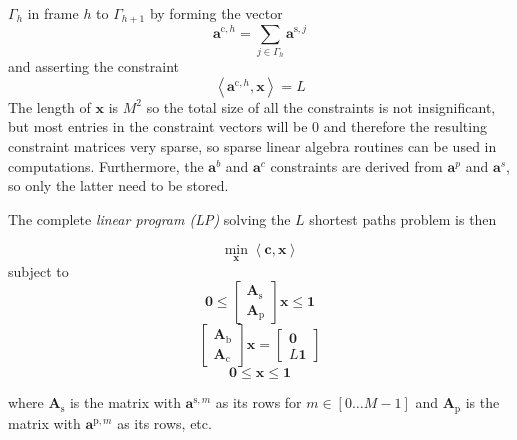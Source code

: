 $\Gamma_{h}$ in frame $h$ to $\Gamma_{h+1}$ by forming the vector
\[
    \boldsymbol{a}^{\text{c},h} = \sum_{j \in \Gamma_{h}}
    \boldsymbol{a}^{\text{s},j}
\]
and asserting the constraint
\[
    \left\langle \boldsymbol{a}^{\text{c},h} , \boldsymbol{x} \right\rangle = L
\]
The length of $\boldsymbol{x}$ is $M^{2}$ so the total size of all the
constraints is not insignificant, but most entries in the constraint vectors will
be 0 and therefore the resulting constraint matrices very sparse, so sparse
linear algebra routines can be used in computations. Furthermore, the
$\boldsymbol{a}^{b}$ and $\boldsymbol{a}^{c}$ constraints are derived from
$\boldsymbol{a}^{p}$ and $\boldsymbol{a}^{s}$, so only the latter need to be
stored.

The complete \textit{linear program (LP)} solving the $L$ shortest paths problem is then
\begin{samepage}
\[
    \min_{\boldsymbol{x}} \left\langle \boldsymbol{c}, \boldsymbol{x} \right\rangle
\]
subject to
\[
    \boldsymbol{0} \leq
    \begin{bmatrix}
        \boldsymbol{A}_{\text{s}} \\
        \boldsymbol{A}_{\text{p}}
    \end{bmatrix} \boldsymbol{x}
    \leq \boldsymbol{1}
\]
\[
    \begin{bmatrix}
        \boldsymbol{A}_{\text{b}} \\
        \boldsymbol{A}_{\text{c}}
    \end{bmatrix}
    \boldsymbol{x}
    =
    \begin{bmatrix}
        \boldsymbol{0} \\
        L\boldsymbol{1}
    \end{bmatrix}
\]
\[
    \boldsymbol{0} \leq \boldsymbol{x} \leq \boldsymbol{1}
\]
\end{samepage}
where $\boldsymbol{A}_{\text{s}}$ is the matrix with
$\boldsymbol{a}^{\text{s},m}$ as its rows for $m \in [0 \dotsc M-1]$ and
$\boldsymbol{A}_{\text{p}}$ is the matrix with $\boldsymbol{a}^{\text{p},m}$ as
its rows, etc.

